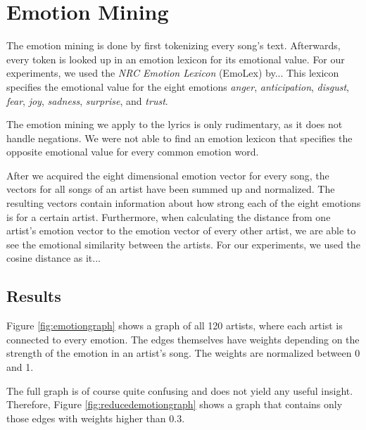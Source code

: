 \documentclass[10pt,a4paper]{article}
\begin{document}
	\section{Emotion Mining}
	\label{sec:emotionmining}
	The emotion mining is done by first tokenizing every song's text. Afterwards, every token is looked up in an emotion lexicon for its emotional value. For our experiments, we used the \textit{NRC Emotion Lexicon} (EmoLex) by... This lexicon specifies the emotional value for the eight emotions \textit{anger}, \textit{anticipation}, \textit{disgust}, \textit{fear}, \textit{joy}, \textit{sadness}, \textit{surprise}, and \textit{trust}.
	
	The emotion mining we apply to the lyrics is only rudimentary, as it does not handle negations. We were not able to find an emotion lexicon that specifies the opposite emotional value for every common emotion word.
	
	After we acquired the eight dimensional emotion vector for every song, the vectors for all songs of an artist have been summed up and normalized. The resulting vectors contain information about how strong each of the eight emotions is for a certain artist. Furthermore, when calculating the distance from one artist's emotion vector to the emotion vector of every other artist, we are able to see the emotional similarity between the artists. For our experiments, we used the cosine distance as it...
	
		\subsection{Results}
		Figure \ref{fig:emotiongraph} shows a graph of all 120 artists, where each artist is connected to every emotion. The edges themselves have weights depending on the strength of the emotion in an artist's song. The weights are normalized between 0 and 1.
		
		The full graph is of course quite confusing and does not yield any useful insight. Therefore, Figure \ref{fig:reducedemotiongraph} shows a graph that contains only those edges with weights higher than $0.3$. %
		
\end{document}
